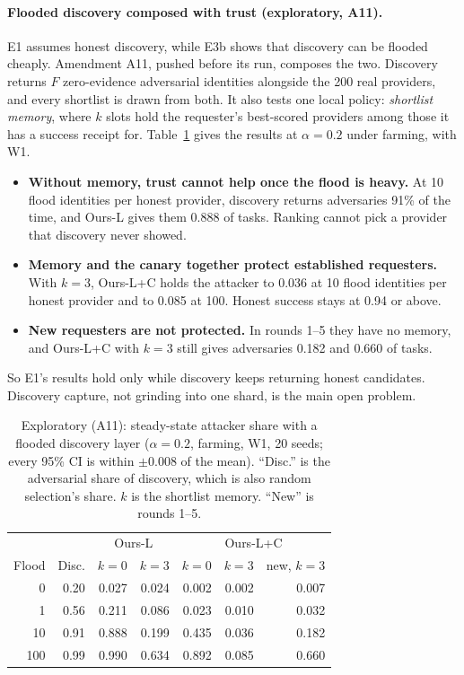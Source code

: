 \paragraph{Flooded discovery composed with trust (exploratory, A11).}
E1 assumes honest discovery, while E3b shows that discovery can be
flooded cheaply. Amendment A11, pushed before its run, composes the two.
Discovery returns $F$ zero-evidence adversarial identities alongside the
200 real providers, and every shortlist is drawn from both. It also
tests one local policy: \emph{shortlist memory}, where $k$ slots hold the
requester's best-scored providers among those it has a success receipt
for. Table~\ref{tab:flood} gives the results at $\alpha{=}0.2$ under
farming, with W1.
\begin{itemize}
\item \textbf{Without memory, trust cannot help once the flood is
  heavy.} At 10 flood identities per honest provider, discovery returns
  adversaries 91\% of the time, and Ours-L gives them 0.888 of tasks.
  Ranking cannot pick a provider that discovery never showed.
\item \textbf{Memory and the canary together protect established
  requesters.} With $k{=}3$, Ours-L+C holds the attacker to 0.036 at 10
  flood identities per honest provider and to 0.085 at 100. Honest
  success stays at 0.94 or above.
\item \textbf{New requesters are not protected.} In rounds 1--5 they have
  no memory, and Ours-L+C with $k{=}3$ still gives adversaries 0.182 and
  0.660 of tasks.
\end{itemize}
So E1's results hold only while discovery keeps returning honest
candidates. Discovery capture, not grinding into one shard, is the main
open problem.

\begin{table}[t]
\caption{Exploratory (A11): steady-state attacker share with a flooded
discovery layer ($\alpha{=}0.2$, farming, W1, 20 seeds; every 95\% CI is
within $\pm$0.008 of the mean). ``Disc.'' is the adversarial share of
discovery, which is also random selection's share. $k$ is the shortlist
memory. ``New'' is rounds 1--5.}
\label{tab:flood}
\small
\begin{tabular}{@{}rrrrrrr@{}}
\toprule
 & & \multicolumn{2}{c}{Ours-L} & \multicolumn{3}{c}{Ours-L+C} \\
Flood & Disc. & $k{=}0$ & $k{=}3$ & $k{=}0$ & $k{=}3$ & new, $k{=}3$ \\
\midrule
0 & 0.20 & 0.027 & 0.024 & 0.002 & 0.002 & 0.007 \\
1 & 0.56 & 0.211 & 0.086 & 0.023 & 0.010 & 0.032 \\
10 & 0.91 & 0.888 & 0.199 & 0.435 & 0.036 & 0.182 \\
100 & 0.99 & 0.990 & 0.634 & 0.892 & 0.085 & 0.660 \\
\bottomrule
\end{tabular}
\end{table}

